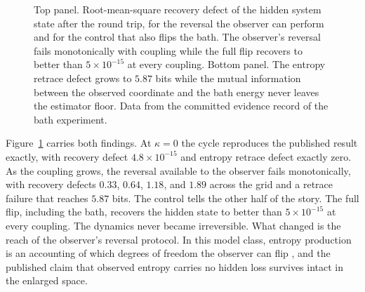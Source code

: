 \documentclass[aps,pre,reprint,nofootinbib]{revtex4-2}
\begin{document}
\begin{figure}[t]
\caption{Top panel.  Root-mean-square recovery defect of the hidden
system state after the round trip, for the reversal the observer can
perform and for the control that also flips the bath.  The observer's
reversal fails monotonically with coupling while the full flip recovers
to better than $5 \times 10^{-15}$ at every coupling.  Bottom panel.  The
entropy retrace defect grows to $5.87$ bits while the mutual information
between the observed coordinate and the bath energy never leaves the
estimator floor.  Data from the committed evidence record of the bath
experiment.}
\label{fig:pe4}
\end{figure}

Figure~\ref{fig:pe4} carries both findings.  At $\kappa = 0$ the cycle
reproduces the published result exactly, with recovery defect
$4.8 \times 10^{-15}$ and entropy retrace defect exactly zero.  As the
coupling grows, the reversal available to the observer fails
monotonically, with recovery defects $0.33$, $0.64$, $1.18$, and $1.89$
across the grid and a retrace failure that reaches $5.87$ bits.  The
control tells the other half of the story.  The full flip, including the
bath, recovers the hidden state to better than $5 \times 10^{-15}$ at
every coupling.  The dynamics never became irreversible.  What changed is
the reach of the observer's reversal protocol.  In this model class,
entropy production is an accounting of which degrees of freedom the
observer can flip \cite{Landauer1961, Bennett1982}, and the published
claim that observed entropy carries
no hidden loss survives intact in the enlarged space.
\end{document}
